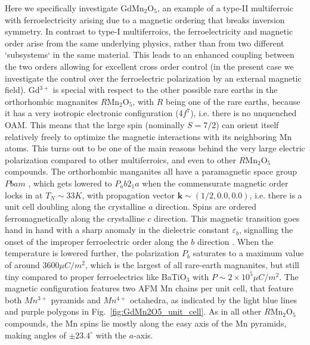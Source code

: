 Here we specifically investigate GdMn$_2$O$_5$, an example of a type-II multiferroic\cite{Khomskii2009} with ferroelectricity arising due to a magnetic ordering that breaks inversion symmetry. In contrast to type-I multiferroics, the ferroelectricity and magnetic order arise from the same underlying physics, rather than from two different `subsystems` in the same material. This leads to an enhanced coupling between the two orders allowing for excellent cross order control (in the present case we investigate the control over the ferroelectric polarization by an external magnetic field).
Gd$^{3+}$ is special with respect to the other possible rare earths in the orthorhombic magnanites $R$Mn$_2$O$_5$, with $R$ being one of the rare earths, because it has a very isotropic electronic configuration (4$f^7$), i.e. there is no unquenched OAM. This means that the large spin (nominally $S=7/2$) can orient itself relatively freely to optimize the magnetic interactions with its neighboring Mn atoms.
This turns out to be one of the main reasons behind the very large electric polarization compared to other multiferroics, and even to other $R$Mn$_2$O$_5$ compounds.
The orthorhombic manganites all have a paramagnetic space group $Pbam$ \cite{Alfonso97a}, which gets lowered to $P_ab2_1a$ when the commensurate magnetic order locks in at $T_{N} \sim 33K$, with propagation vector $\bm{k} \sim (1/2, 0.0, 0.0)$, i.e. there is a unit cell doubling along the crystalline $a$ direction. Spins are ordered ferromagnetically along the crystalline $c$ direction. This magnetic transition goes hand in hand with a sharp anomaly in the dielectric constant $\varepsilon_b$, signalling the onset of the improper ferroelectric order along the $b$ direction \cite{Lee13}. When the temperature is lowered further, the polarization $P_b$ saturates to a maximum value of around $3600 \mu C/m^2$, which is the largest of all rare-earth magnanites, but still tiny compared to proper ferroelectrics like BaTiO$_3$ with $P \sim 2 \times 10^5 \mu C/m^2$.
The magnetic configuration features two AFM Mn chains per unit cell, that feature both $Mn^{3+}$ pyramids and $Mn^{4+}$ octahedra, as indicated by the light blue lines and purple polygons in Fig.~\ref{fig:GdMn2O5_unit_cell}. As in all other $R$Mn$_2$O$_5$ compounds, the Mn spins lie mostly along the easy axis of the Mn pyramids, making angles of $\pm 23.4^\circ$ with the $a$-axis.



